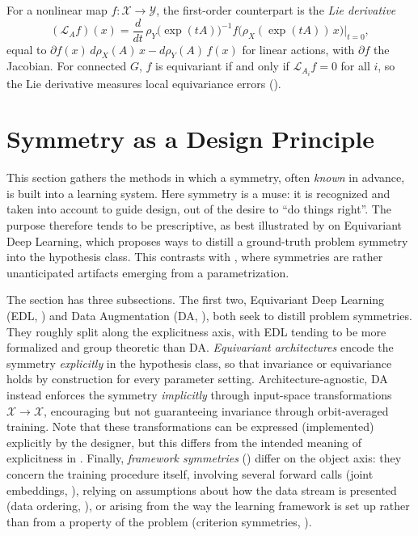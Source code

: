\documentclass[mathematics,review,submit,moreauthors]{Definitions/mdpi}
\begin{document}
For a nonlinear map $f:\mathcal{X}\to\mathcal{Y}$, the first-order counterpart is the \emph{Lie derivative}
\[
    (\mathcal{L}_Af)(x)=\frac{d}{dt}\,\rho_Y\big(\exp(tA)\big)^{-1}f\big(\rho_X(\exp(tA))\,x\big)\Big\vert_{t=0},
\]
equal to $\partial f(x)\,d\rho_X(A)\,x-d\rho_Y(A)\,f(x)$ for linear actions, with $\partial f$ the Jacobian.
For connected $G$, $f$ is equivariant if and only if $\mathcal{L}_{A_i}f=0$ for all $i$, so the Lie derivative measures local equivariance errors ().

\section{Symmetry as a Design Principle}\label{sec:design-principle}

This section gathers the methods in which a symmetry, often \emph{known} in advance, is built into a learning system.
Here symmetry is a muse: it is recognized and taken into account to guide design, out of the desire to ``do things right''.
The purpose therefore tends to be prescriptive, as best illustrated by  on Equivariant Deep Learning, which proposes ways to distill a ground-truth problem symmetry into the hypothesis class.
This contrasts with , where symmetries are rather unanticipated artifacts emerging from a parametrization.

The section has three subsections.
The first two, Equivariant Deep Learning (EDL, ) and Data Augmentation (DA, ), both seek to distill problem symmetries.
They roughly split along the explicitness axis, with EDL tending to be more formalized and group theoretic than DA.
\emph{Equivariant architectures} encode the symmetry \emph{explicitly} in the hypothesis class, so that invariance or equivariance holds by construction for every parameter setting.
Architecture-agnostic, DA instead enforces the symmetry \emph{implicitly} through input-space transformations $\mathcal X \to \mathcal X$, encouraging but not guaranteeing invariance through orbit-averaged training.
Note that these transformations can be expressed (implemented) explicitly by the designer, but this differs from the intended meaning of explicitness in .
Finally, \emph{framework symmetries} () differ on the object axis: they concern the training procedure itself, involving several forward calls (joint embeddings, ), relying on assumptions about how the data stream is presented (data ordering, ), or arising from the way the learning framework is set up rather than from a property of the problem (criterion symmetries, ).
\end{document}
